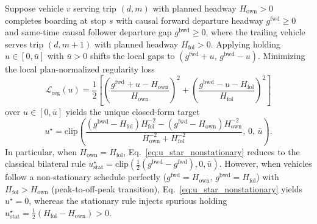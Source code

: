 \begin{proposition}
\label{prop:nonstationary_target}
Suppose vehicle $v$ serving trip $(d,m)$ with planned headway $H_{\mathrm{own}} > 0$ completes boarding at stop $s$ with causal forward departure headway $g^{\mathrm{fwd}} \ge 0$ and same-time causal follower departure gap $g^{\mathrm{bwd}} \ge 0$, where the trailing vehicle serves trip $(d,m+1)$ with planned headway $H_{\mathrm{fol}} > 0$. Applying holding $u \in [0,\bar u]$ with $\bar u>0$ shifts the local gaps to $(g^{\mathrm{fwd}} + u,\, g^{\mathrm{bwd}} - u)$. Minimizing the local plan-normalized regularity loss
\begin{equation}
  \mathcal{L}_{\mathrm{reg}}(u) = \frac{1}{2}\left[\left(\frac{g^{\mathrm{fwd}} + u - H_{\mathrm{own}}}{H_{\mathrm{own}}}\right)^2 + \left(\frac{g^{\mathrm{bwd}} - u - H_{\mathrm{fol}}}{H_{\mathrm{fol}}}\right)^2\right]
  \label{eq:local_reg_loss}
\end{equation}
over $u \in [0, \bar{u}]$ yields the unique closed-form target
\begin{equation}
  u^\star = \mathrm{clip}\!\left(
    \frac{(g^{\mathrm{bwd}} - H_{\mathrm{fol}}) H_{\mathrm{fol}}^{-2} - (g^{\mathrm{fwd}} - H_{\mathrm{own}}) H_{\mathrm{own}}^{-2}}{H_{\mathrm{own}}^{-2} + H_{\mathrm{fol}}^{-2}},
    \, 0,\, \bar{u}
  \right).
  \label{eq:u_star_nonstationary}
\end{equation}
In particular, when $H_{\mathrm{own}} = H_{\mathrm{fol}}$, Eq.~\eqref{eq:u_star_nonstationary} reduces to the classical bilateral rule $u_{\mathrm{stat}}^\star = \mathrm{clip}(\frac{1}{2}(g^{\mathrm{bwd}} - g^{\mathrm{fwd}}), 0, \bar{u})$. However, when vehicles follow a non-stationary schedule perfectly ($g^{\mathrm{fwd}} = H_{\mathrm{own}}$, $g^{\mathrm{bwd}} = H_{\mathrm{fol}}$) with $H_{\mathrm{fol}} > H_{\mathrm{own}}$ (peak-to-off-peak transition), Eq.~\eqref{eq:u_star_nonstationary} yields $u^\star = 0$, whereas the stationary rule injects spurious holding $u_{\mathrm{stat}}^\star = \frac{1}{2}(H_{\mathrm{fol}} - H_{\mathrm{own}}) > 0$.
\end{proposition}

